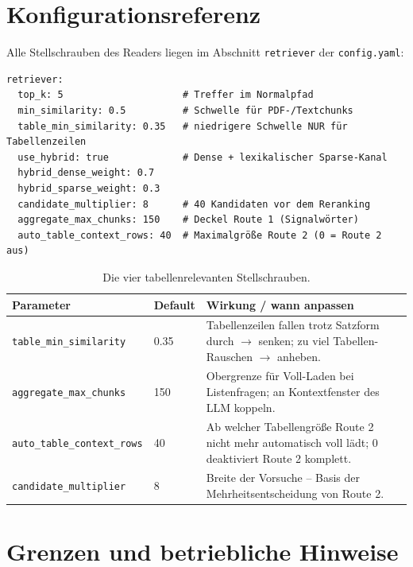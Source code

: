 \documentclass[12pt, a4paper]{article}
\begin{document}
\section{Konfigurationsreferenz}

Alle Stellschrauben des Readers liegen im Abschnitt \texttt{retriever} der
\texttt{config.yaml}:

\begin{lstlisting}[style=yamlstyle]
retriever:
  top_k: 5                     # Treffer im Normalpfad
  min_similarity: 0.5          # Schwelle für PDF-/Textchunks
  table_min_similarity: 0.35   # niedrigere Schwelle NUR für Tabellenzeilen
  use_hybrid: true             # Dense + lexikalischer Sparse-Kanal
  hybrid_dense_weight: 0.7
  hybrid_sparse_weight: 0.3
  candidate_multiplier: 8      # 40 Kandidaten vor dem Reranking
  aggregate_max_chunks: 150    # Deckel Route 1 (Signalwörter)
  auto_table_context_rows: 40  # Maximalgröße Route 2 (0 = Route 2 aus)
\end{lstlisting}

\begin{table}[H]
\centering
\small
\begin{tabularx}{\textwidth}{@{}l l X@{}}
\toprule
\textbf{Parameter} & \textbf{Default} & \textbf{Wirkung / wann anpassen} \\
\midrule
\texttt{table\_min\_similarity} & 0.35 & Tabellenzeilen fallen trotz Satzform durch $\rightarrow$ senken; zu viel Tabellen-Rauschen $\rightarrow$ anheben. \\
\texttt{aggregate\_max\_chunks} & 150 & Obergrenze für Voll-Laden bei Listenfragen; an Kontextfenster des LLM koppeln. \\
\texttt{auto\_table\_context\_rows} & 40 & Ab welcher Tabellengröße Route 2 nicht mehr automatisch voll lädt; 0 deaktiviert Route 2 komplett. \\
\texttt{candidate\_multiplier} & 8 & Breite der Vorsuche -- Basis der Mehrheitsentscheidung von Route 2. \\
\bottomrule
\end{tabularx}
\caption{Die vier tabellenrelevanten Stellschrauben.}
\end{table}

\section{Grenzen und betriebliche Hinweise}
\end{document}
